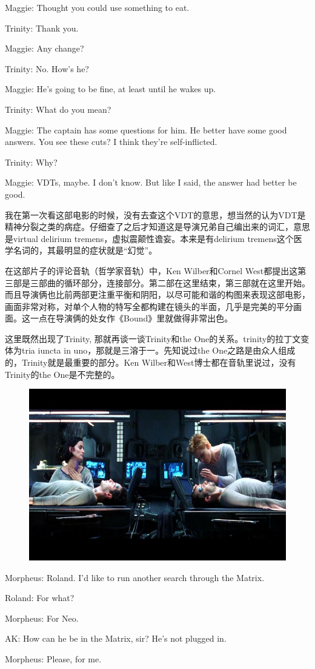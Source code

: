 \documentclass[UTF8]{ctexart}
\newenvironment{myquote}{\color{green} \setlength{\leftskip}{6em} \setlength{\rightskip}{4em} \setlength{\parindent}{-2em}}{\par}
\begin{document}
\begin{myquote}
Maggie: Thought you could use something to eat.

Trinity: Thank you.

Maggie: Any change?

Trinity: No. How's he?

Maggie: He's going to be fine, at least until he wakes up.

Trinity: What do you mean?

Maggie: The captain has some questions for him. He better have some good answers. You see these cuts? I think they're self-inflicted.

Trinity: Why?

Maggie: VDTs, maybe. I don't know. But like I said, the answer had better be good.
\end{myquote}

我在第一次看这部电影的时候，没有去查这个VDT的意思，想当然的认为VDT是精神分裂之类的病症。仔细查了之后才知道这是导演兄弟自己编出来的词汇，意思是virtual delirium tremens，虚拟震颠性谵妄。本来是有delirium tremens这个医学名词的，其最明显的症状就是“幻觉”。

在这部片子的评论音轨（哲学家音轨）中，Ken Wilber和Cornel West都提出这第三部是三部曲的循环部分，连接部分。第二部在这里结束，第三部就在这里开始。而且导演俩也比前两部更注重平衡和阴阳，以尽可能和谐的构图来表现这部电影，画面非常对称，对单个人物的特写全都构建在镜头的半面，几乎是完美的平分画面。这一点在导演俩的处女作《Bound》里就做得非常出色。

这里既然出现了Trinity, 那就再谈一谈Trinity和the One的关系。trinity的拉丁文变体为tria iuncta in uno，那就是三溶于一。先知说过the One之路是由众人组成的，Trinity就是最重要的部分。Ken Wilber和West博士都在音轨里说过，没有Trinity的the One是不完整的。

\begin{figure}[htb]
\centering
\includegraphics[width=0.5\linewidth]{fig/3c8e8b13f5346bd0f7039e12.jpg}
\end{figure}

\begin{myquote}
Morpheus: Roland. I'd like to run another search through the Matrix.

Roland: For what?

Morpheus: For Neo.

AK: How can he be in the Matrix, sir? He's not plugged in.

Morpheus: Please, for me.
\end{myquote}
\end{document}
